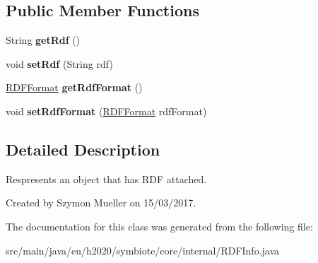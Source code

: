 \subsection*{Public Member Functions}
\begin{DoxyCompactItemize}
\item 
\mbox{\label{classeu_1_1h2020_1_1symbiote_1_1core_1_1internal_1_1RDFInfo_abcd112b86e0542cf3674b551d823cb1a}} 
String {\bfseries get\+Rdf} ()
\item 
\mbox{\label{classeu_1_1h2020_1_1symbiote_1_1core_1_1internal_1_1RDFInfo_af5a00238e8cdf7f21c688e6fd8900553}} 
void {\bfseries set\+Rdf} (String rdf)
\item 
\mbox{\label{classeu_1_1h2020_1_1symbiote_1_1core_1_1internal_1_1RDFInfo_a268b1e945924049ab68b0adea1374e75}} 
\hyperlink{enumeu_1_1h2020_1_1symbiote_1_1core_1_1internal_1_1RDFFormat}{R\+D\+F\+Format} {\bfseries get\+Rdf\+Format} ()
\item 
\mbox{\label{classeu_1_1h2020_1_1symbiote_1_1core_1_1internal_1_1RDFInfo_ad4ad9eedbb4a15b3614d7f00e8218d52}} 
void {\bfseries set\+Rdf\+Format} (\hyperlink{enumeu_1_1h2020_1_1symbiote_1_1core_1_1internal_1_1RDFFormat}{R\+D\+F\+Format} rdf\+Format)
\end{DoxyCompactItemize}


\subsection{Detailed Description}
Respresents an object that has R\+DF attached.

Created by Szymon Mueller on 15/03/2017. 

The documentation for this class was generated from the following file\+:\begin{DoxyCompactItemize}
\item 
src/main/java/eu/h2020/symbiote/core/internal/R\+D\+F\+Info.\+java\end{DoxyCompactItemize}
